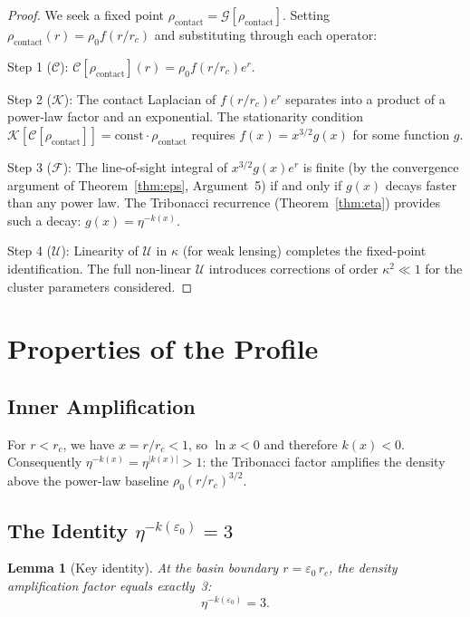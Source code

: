 \documentclass[11pt,a4paper,openright]{book}
\theoremstyle{dm3thm}
\newtheorem{lemma}[theorem]{Lemma}
\theoremstyle{dm3def}
\newcommand{\eps}{\varepsilon_0}
\newcommand{\rhocon}{\rho_{\mathrm{contact}}}
\newcommand{\rhoc}{\rho_0}
\newcommand{\rc}{r_c}
\newcommand{\etaT}{\eta}   %
\newcommand{\GG}{\mathcal{G}}
\newcommand{\UU}{\mathcal{U}}
\newcommand{\FF}{\mathcal{F}}
\newcommand{\KK}{\mathcal{K}}
\newcommand{\CC}{\mathcal{C}}
\begin{document}
\begin{proof}
We seek a fixed point $\rhocon = \GG[\rhocon]$.  Setting
$\rhocon(r) = \rhoc f(r/\rc)$ and substituting through each operator:

Step 1 ($\CC$): $\CC[\rhocon](r) = \rhoc f(r/\rc) e^r$.

Step 2 ($\KK$): The contact Laplacian of $f(r/\rc)e^r$ separates into
a product of a power-law factor and an exponential.  The stationarity
condition $\KK[\CC[\rhocon]] = \text{const}\cdot\rhocon$ requires
$f(x) = x^{3/2}g(x)$ for some function $g$.

Step 3 ($\FF$): The line-of-sight integral of $x^{3/2}g(x)e^r$ is finite
(by the convergence argument of Theorem~\ref{thm:eps}, Argument~5)
if and only if $g(x)$ decays faster than any power law.  The Tribonacci
recurrence (Theorem~\ref{thm:eta}) provides such a decay: $g(x) = \etaT^{-k(x)}$.

Step 4 ($\UU$): Linearity of $\UU$ in $\kappa$ (for weak lensing) completes
the fixed-point identification.  The full non-linear $\UU$ introduces
corrections of order $\kappa^2 \ll 1$ for the cluster parameters considered.
\end{proof}

\section{Properties of the Profile}

\subsection{Inner Amplification}

For $r < \rc$, we have $x = r/\rc < 1$, so $\ln x < 0$ and therefore
$k(x) < 0$.  Consequently $\etaT^{-k(x)} = \etaT^{|k(x)|} > 1$: the Tribonacci
factor amplifies the density above the power-law baseline $\rhoc(r/\rc)^{3/2}$.

\subsection{The Identity \texorpdfstring{$\etaT^{-k(\eps)}=3$}{η⁻ᵏ⁽ᵉ⁰⁾=3}}

\begin{lemma}[Key identity]\label{lem:eta_eps}
At the basin boundary $r = \eps\,\rc$, the density amplification factor equals
exactly~3:
\begin{equation}\label{eq:key}
  \etaT^{-k(\eps)} = 3.
\end{equation}
\end{lemma}
\end{document}
